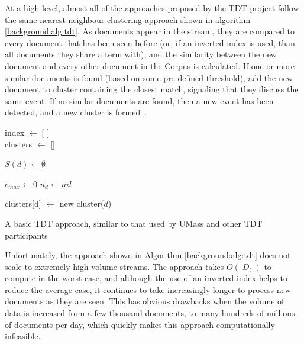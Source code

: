 At a high level, almost all of the approaches proposed by the TDT project follow the same nearest-neighbour clustering approach shown in algorithm \ref{background:alg:tdt}.
As documents appear in the stream, they are compared to every document that has been seen before (or, if an inverted index is used, than all documents they share a term with), and the similarity between the new document and every other document in the Corpus is calculated.
If one or more similar documents is found (based on some pre-defined threshold), add the new document to cluster containing the closest match, signaling that they discuss the same event.
If no similar documents are found, then a new event has been detected, and a new cluster is formed~\citep{Allan:2000:FSD:354756.354843}.

\begin{algorithm}
	\DontPrintSemicolon
	index $\gets []$ \\
	clusters $\gets$ [] \\

	 {
		$S(d) \gets \emptyset$ 


		$c_{max} \gets 0$ 
		$n_{d} \gets nil$ 

		 {
			clusters[d] $\gets$ new cluster($d$) 
		}

	}
	\caption{A basic TDT approach, similar to that used by UMass and other TDT participants}
	\label{background:alg:tdt}
\end{algorithm}

Unfortunately, the approach shown in Algorithm \ref{background:alg:tdt} does not scale to extremely high volume streams.
The approach takes $O(|D_t|)$ to compute in the worst case, and although the use of an inverted index helps to reduce the average case, it continues to take increasingly longer to process new documents as they are seen.
This has obvious drawbacks when the volume of data is increased from a few thousand documents, to many hundreds of millions of documents per day, which quickly makes this approach computationally infeasible.

